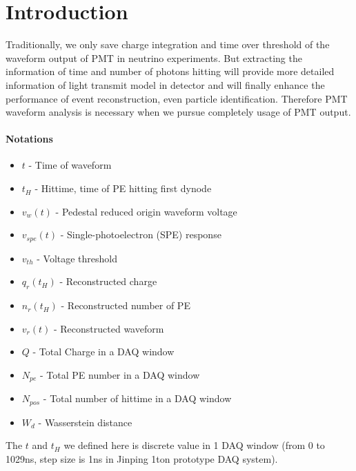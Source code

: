 \section{Introduction} %
\label{sec:Introduction}
Traditionally, we only save charge integration and time over threshold of the waveform output of PMT in neutrino experiments. But extracting the information of time and number of photons hitting will provide more detailed information of light transmit model in detector and will finally enhance the performance of event reconstruction, even particle identification. Therefore PMT waveform analysis is necessary when we pursue completely usage of PMT output. 

\paragraph{Notations}
\begin{itemize}
    \item $t$ - Time of waveform
    \item $t_{H}$ - Hittime, time of PE hitting first dynode
    \item $v_{w}(t)$ - Pedestal reduced origin waveform voltage
    \item $v_{spe}(t)$ - Single-photoelectron (SPE) response
    \item $v_{th}$ - Voltage threshold
    \item $q_{r}(t_{H})$ - Reconstructed charge
    \item $n_{r}(t_{H})$ - Reconstructed number of PE
    \item $v_{r}(t)$ - Reconstructed waveform
    \item $Q$ - Total Charge in a DAQ window
    \item $N_{pe}$ - Total PE number in a DAQ window
    \item $N_{pos}$ - Total number of hittime in a DAQ window
    \item $W_{d}$ - Wasserstein distance
\end{itemize}
The $t$ and $t_{H}$ we defined here is discrete value in 1 DAQ window (from 0 to 1029ns, step size is 1ns in Jinping 1ton prototype DAQ system). 
